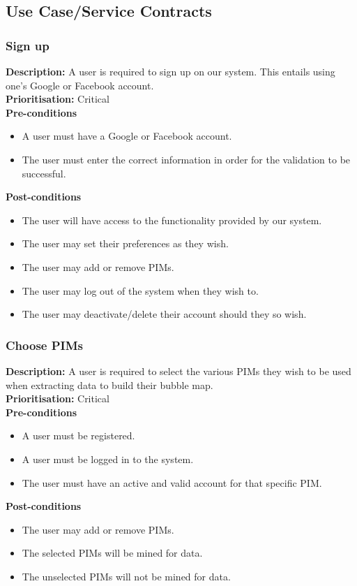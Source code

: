 \documentclass[hidelinks,english]{article}
\begin{document}
		\subsection{Use Case/Service Contracts}
			\subsubsection{Sign up}
				\textbf{Description:}  A user is required to sign up on our system. This entails using one's Google or Facebook account.\\
    			\textbf{Prioritisation:} Critical\\
      			\textbf{Pre-conditions}
    			\begin{itemize}
        			\item A user must have a Google or Facebook account.
        			\item The user must enter the correct information in order for the validation to be successful.
    			\end{itemize}
    			\textbf{Post-conditions}
     			\begin{itemize}
        			\item The user will have access to the functionality provided by our system.
        			\item The user may set their preferences as they wish.
        			\item The user may add or remove PIMs.
        			\item The user may log out of the system when they wish to.
        			\item The user may deactivate/delete their account should they so wish.
    			\end{itemize}
    			
    		\subsubsection{Choose PIMs}
				\textbf{Description:}  A user is required to select the various PIMs they wish to be used when extracting data to build their bubble map.\\
    			\textbf{Prioritisation:} Critical\\
      			\textbf{Pre-conditions}
    			\begin{itemize}
        			\item A user must be registered.
        			\item A user must be logged in to the system.
        			\item The user must have an active and valid account for that specific PIM.
    			\end{itemize}
    			\textbf{Post-conditions}
     			\begin{itemize}
        			\item The user may add or remove PIMs.
        			\item The selected PIMs will be mined for data.
        			\item The unselected PIMs will not be mined for data.
    			\end{itemize}
    			
\end{document}
